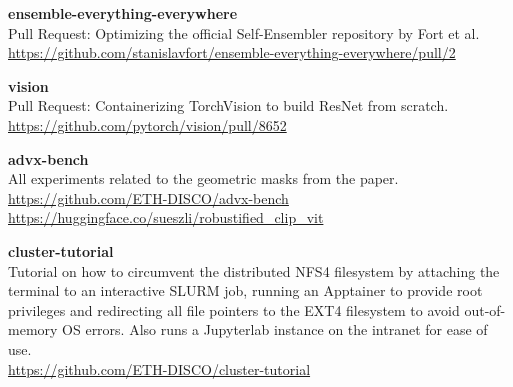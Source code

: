 \documentclass[a4paper, oneside]{discothesis}
\newcommand{\linebreaks}{\vspace*{0.5em}}
\begin{document}
\linebreaks

\begin{samepage}
	\begin{spacing}{1}
		\textbf{ensemble-everything-everywhere} \\
		Pull Request: Optimizing the official Self-Ensembler repository by Fort et al. \\
		\url{https://github.com/stanislavfort/ensemble-everything-everywhere/pull/2}
	\end{spacing}
\end{samepage}

\linebreaks

\begin{samepage}
	\begin{spacing}{1}
		\textbf{vision} \\
		Pull Request: Containerizing TorchVision to build ResNet from scratch. \\
		\url{https://github.com/pytorch/vision/pull/8652}
	\end{spacing}
\end{samepage}

\linebreaks

\begin{samepage}
	\begin{spacing}{1}
		\textbf{advx-bench} \\
		All experiments related to the geometric masks from the paper. \\
		\url{https://github.com/ETH-DISCO/advx-bench} \\
		\url{https://huggingface.co/sueszli/robustified_clip_vit}
	\end{spacing}
\end{samepage}

\linebreaks

\begin{samepage}
	\begin{spacing}{1}
		\textbf{cluster-tutorial} \\
		Tutorial on how to circumvent the distributed NFS4 filesystem by attaching the terminal to an interactive SLURM job, running an Apptainer to provide root privileges and redirecting all file pointers to the EXT4 filesystem to avoid out-of-memory OS errors. Also runs a Jupyterlab instance on the intranet for ease of use. \\
		\url{https://github.com/ETH-DISCO/cluster-tutorial}
	\end{spacing}
\end{samepage}
\end{document}

